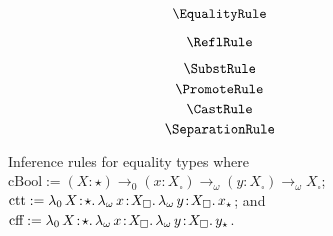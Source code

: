 
\begin{figure}
    \centering
    \begin{minipage}{0.5\textwidth}
        $$\EqualityRule$$
    \end{minipage}%
    \begin{minipage}{0.5\textwidth}
        $$\ReflRule$$
    \end{minipage}%
    $$\SubstRule$$
    $$\PromoteRule$$
    $$\CastRule$$
    $$\SeparationRule$$
    \caption{
        Inference rules for equality types where
        $\text{cBool} := (X : \star) \to_0 (x : X_\square) \to_\omega (y : X_\square) \to_\omega X_\square$;
        $\text{ctt} := \abs{\lambda_0}{X}{\star}{
            \abs{\lambda_\omega}{x}{X_\square}{
                \abs{\lambda_\omega}{y}{X_\square}{x_\star}
            }
        }$;
        and
        $\text{cff} := \abs{\lambda_0}{X}{\star}{
            \abs{\lambda_\omega}{x}{X_\square}{
                \abs{\lambda_\omega}{y}{X_\square}{y_\star}
            }
        }$.
    }
    \label{fig:2:typ3}
\end{figure}
